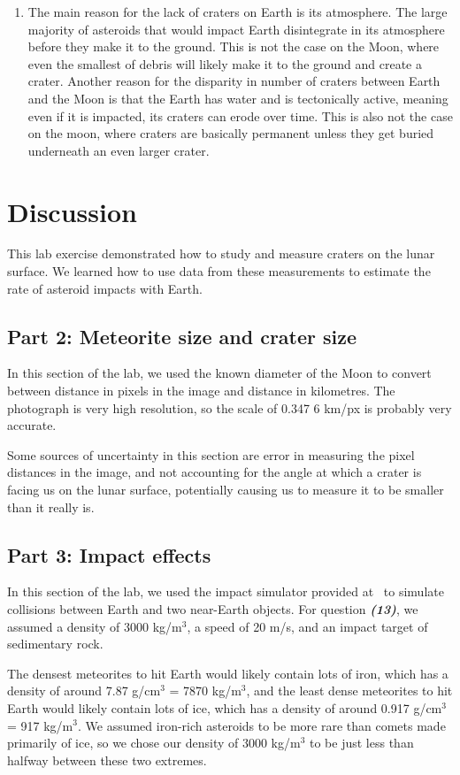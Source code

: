 \documentclass[11pt]{article}
\begin{document}
\begin{enumerate}[label={\textbf{\emph{(\arabic*)}}}]
	\item %
The main reason for the lack of craters on Earth is its atmosphere.
The large majority of asteroids that would impact Earth disintegrate in its atmosphere before they make it to the ground.
This is not the case on the Moon, where even the smallest of debris will likely make it to the ground and create a crater.
Another reason for the disparity in number of craters between Earth and the Moon is that the Earth has water and is tectonically active, meaning even if it is impacted, its craters can erode over time.
This is also not the case on the moon, where craters are basically permanent unless they get buried underneath an even larger crater.

\end{enumerate}


\section{Discussion}
This lab exercise demonstrated how to study and measure craters on the lunar surface.
We learned how to use data from these measurements to estimate the rate of asteroid impacts with Earth.


\subsection*{Part 2: Meteorite size and crater size}
In this section of the lab, we used the known diameter of the Moon to convert between distance in pixels in the image and distance in kilometres.
The photograph is very high resolution, so the scale of 0.347 6 km/px is probably very accurate.

Some sources of uncertainty in this section are error in measuring the pixel distances in the image, and not accounting for the angle at which a crater is facing us on the lunar surface, potentially causing us to measure it to be smaller than it really is.


\subsection*{Part 3: Impact effects}
In this section of the lab, we used the impact simulator provided at~\cite{impact-simulator} to simulate collisions between Earth and two near-Earth objects.
For question \textbf{\emph{(13)}}, we assumed a density of 3000 kg/m$^3$, a speed of 20 m/s, and an impact target of sedimentary rock.

The densest meteorites to hit Earth would likely contain lots of iron, which has a density of around 7.87 g/cm$^3$ = 7870 kg/m$^3$, and the least dense meteorites to hit Earth would likely contain lots of ice, which has a density of around 0.917 g/cm$^3$ = 917 kg/m$^3$.
We assumed iron-rich asteroids to be more rare than comets made primarily of ice, so we chose our density of 3000 kg/m$^3$ to be just less than halfway between these two extremes.
\end{document}

